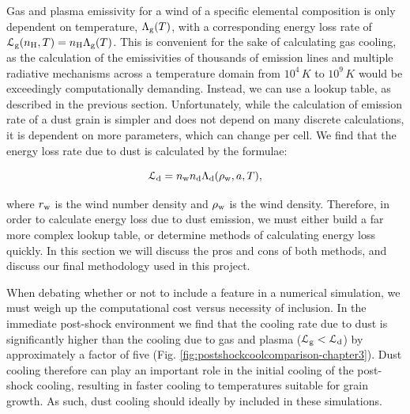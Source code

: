 Gas and plasma emissivity for a wind of a specific elemental composition is only dependent on temperature, $\Lambda_\text{g}(T)$, with a corresponding energy loss rate of $\mathcal{L}_\text{g} (n_\text{H},T) = n_\text{H} \Lambda_\text{g}(T)$. 
This is convenient for the sake of calculating gas cooling, as the calculation of the emissivities of thousands of emission lines and multiple radiative mechanisms across a temperature domain from $10^4\, \si{K}$ to $10^9\,\si{K}$ would be exceedingly computationally demanding.
Instead, we can use a lookup table, as described in the previous section.
Unfortunately, while the calculation of emission rate of a dust grain is simpler and does not depend on many discrete calculations, it is dependent on more parameters, which can change per cell.
We find that the energy loss rate due to dust is calculated by the formulae:

\begin{equation}
  \mathcal{L}_\text{d} = n_\text{w} n_\text{d} \Lambda_\text{d}(\rho_\text{w},a,T) ,
\end{equation}

\noindent
where $r_\text{w}$ is the wind number density and $\rho_\text{w}$ is the wind density. 
Therefore, in order to calculate energy loss due to dust emission, we must either build a far more complex lookup table, or determine methods of calculating energy loss quickly.
In this section we will discuss the pros and cons of both methods, and discuss our final methodology used in this project.


When debating whether or not to include a feature in a numerical simulation, we must weigh up the computational cost versus necessity of inclusion.
In the immediate post-shock environment we find that the cooling rate due to dust is significantly higher than the cooling due to gas and plasma ($\mathcal{L}_\text{g} < \mathcal{L}_\text{d}$) by approximately a factor of five (Fig. \ref{fig:postshockcoolcomparison-chapter3}).
Dust cooling therefore can play an important role in the initial cooling of the post-shock cooling, resulting in faster cooling to temperatures suitable for grain growth.
As such, dust cooling should ideally by included in these simulations.

